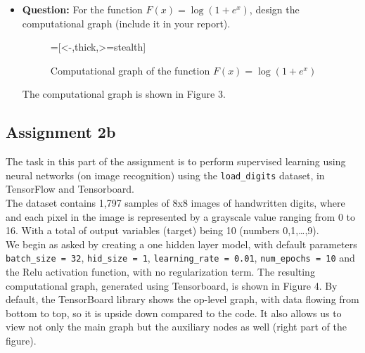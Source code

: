 \documentclass{article}
\def\code#1{\texttt{#1}}
\begin{document}
\begin{itemize}
    \newpage 
    
    \item \textbf{Question: } For the function $F(x) = \log(1+e^{x})$, design the computational graph (include it in your report). \\
    	
	\begin{figure}
		\centering
		\label{fig:3}
		=[<-,thick,>=stealth]
	\caption{Computational graph of the function $F(x) = \log(1+e^x)$}
	
	\end{figure}

    The computational graph is shown in Figure 3. 
        
    \end{itemize}

    \pagebreak
    
    \subsection{Assignment 2b}
    	
    The task in this part of the assignment is to perform supervised learning using neural networks (on image recognition) using the \code{load\_digits} dataset, in TensorFlow and Tensorboard. \\
    
    The dataset contains 1,797 samples of 8x8 images of handwritten digits, where and each pixel in the image is represented by a grayscale value ranging from 0 to 16. With a total of output variables (target)  being 10 (numbers 0,1,\ldots,9). \\
    
    We begin as asked by creating a one hidden layer model, with default parameters \code{batch\_size = 32}, \code{hid\_size = 1}, \code{learning\_rate = 0.01}, \code{num\_epochs = 10} and the Relu activation function, with no regularization term. The resulting computational graph, generated using Tensorboard, is shown in Figure 4. By default, the TensorBoard library shows the op-level graph, with data flowing from bottom to top, so it is upside down compared to the code. It also allows us to view not only the main graph but the auxiliary nodes as well (right part of the figure). \\
    
\end{document}
